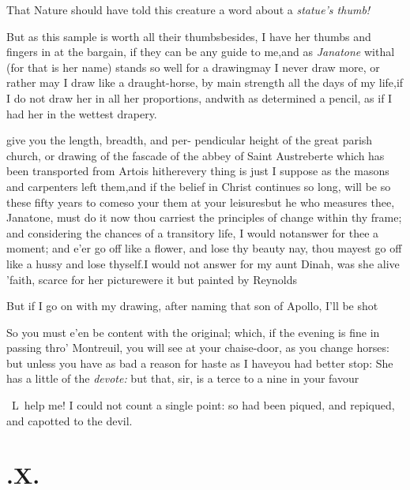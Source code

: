 \documentclass{article}
\begin{document}
\tsk That Nature should have told this creature a word
about a \textit{statue’s thumb!}\tsh

\tsk But as this sample is worth all their thumbs\tsh besides, I have her thumbs and
fingers in at the bargain, if they can be any guide to me,\tsk and as
\textit{Janatone} withal (for that is her name) stands so well for a drawing\tsh may
I never draw more, or rather may I draw like a draught-horse, by main strength all
the days of my life,\tsk if I do not draw her in all her proportions, and\pb with as
determined a pencil, as if I had her in the wettest drapery.\tsh

\noindent
{}\break give you the length, breadth, and
per-\break
pendicular height of the great parish church, or drawing of the fascade of the
abbey of Saint Austreberte which has been transported from Artois
hither\tsk every thing is just I suppose as the masons and carpenters left them,\tsk and
if the\break
belief in Christ continues so long, will be\break
so these fifty years to come\tsk so your\break
{}\break
them at your leisures\tsk but he who\break
measures thee, Janatone, must do it now\break
\tsk thou carriest the
principles of change within thy frame; and considering the chances of a transitory
life, I would not\break answer for thee a moment; and e’er\pb
{}
go off like a flower, and lose thy beauty\break
\tsk nay, thou mayest go off like a hussy\break
\tsk and lose thyself.\tsk I would not answer for my aunt Dinah, was she alive\tsh
’faith, scarce for her picture\tsh were it but painted by Reynolds\tsk

\tsk But if I go on with my drawing, after naming that son of
Apollo, I’ll be shot\tsh

So you must e’en be content with the original; which, if the evening is fine in
passing thro’ Montreuil, you will see at your chaise-door, as you change horses: but
unless you have as bad a reason for haste as I have\tsk you had better stop:\tsk\pb
\tsk She has a little of the \textit{devote:} but\break
that, sir, is a terce to a nine in your\break
favour \tsh

\tsk\ L\tsk\ help me! I could not count a single point: so
had been piqued, and repiqued, and capotted to the devil.

\section{.\enspace X.}
\end{document}
